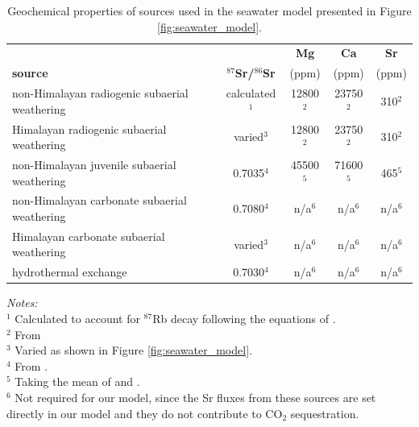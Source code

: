 \documentclass[11pt,letterpaper]{article}
\newcommand{\SrSr}{$^{87}$Sr/$^{86}$Sr\xspace}
\newcommand{\COtwo}{CO$_{2}$\xspace}
\begin{document}
\begin{table}[h!]
\caption{Geochemical properties of sources used in the seawater model presented in Figure \ref{fig:seawater_model}.} 
\begin{center}
    \begin{tabular}{lcccc}
    \hline
     & & \textbf{Mg} & \textbf{Ca} & \textbf{Sr} \\
    \textbf{source} & \textbf{\SrSr} & (ppm) & (ppm) & (ppm) \\
    \hline
    non-Himalayan radiogenic subaerial weathering & calculated$^{1}$ & 12800$^{2}$ & 23750$^{2}$ & 310$^{2}$ \\
    Himalayan radiogenic subaerial weathering & varied$^{3}$ & 12800$^{2}$ & 23750$^{2}$ & 310$^{2}$ \\
    non-Himalayan juvenile subaerial weathering & 0.7035$^{4}$ & 45500$^{5}$ & 71600$^{5}$ & 465$^{5}$ \\
    non-Himalayan carbonate subaerial weathering & 0.7080$^{4}$ & n/a$^{6}$ & n/a$^{6}$ & n/a$^{6}$ \\
    Himalayan carbonate subaerial weathering & varied$^{3}$ & n/a$^{6}$ & n/a$^{6}$ & n/a$^{6}$ \\
    hydrothermal exchange & 0.7030$^{4}$ & n/a$^{6}$ & n/a$^{6}$ & n/a$^{6}$ \\
    \hline
    \end{tabular}
    
    \scriptsize
	\flushleft \emph{Notes:} \\
    $^{1}$ Calculated to account for $^{87}$Rb decay following the equations of \citet{Papanastassiou1968a}.\\
    $^{2}$ From \citet{Wedepohl1995a}\\
    $^{3}$ Varied as shown in Figure \ref{fig:seawater_model}.\\
    $^{4}$ From \citet{Allegre2010a}.\\
    $^{5}$ Taking the mean of \citet{Turekian1961a} and \citet{Taylor1964a}.\\
    $^{6}$ Not required for our model, since the Sr fluxes from these sources are set directly in our model and they do not contribute to \COtwo sequestration.\\
\label{tab:seawater_model}
\end{center}
\end{table}
\end{document}
